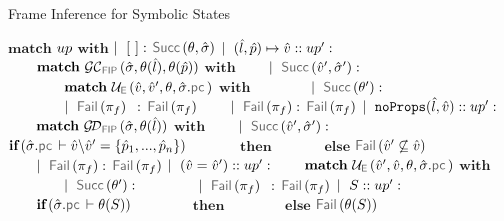 {\begin{algorithm}[h!]
\caption{Frame Inference for Symbolic States}\label{fip:symb:states:up}
\begin{algorithmic}[1]
    \State $\textbf{match}$ $up$ $\textbf{with}$
    \State $\mid~[ \ ]:$ \Return $\success{\subst, \sstate}$
    \State $\mid~(\hat{l}, \hat{p}) \mapsto \hat{v} :: up' :$ 
    \State $\qquad \textbf{match} \ \GetCellV{\sstate, \subst(\sloc), \subst(\sexprp)}$ $\textbf{with}$
    \State $\qquad \mid~\success{\sexprv', \sstate'}:$
    \State $\qquad \qquad \textbf{match} \ \unifylexpr(\sexprv, \sexprv', \subst, \sstate.\pcsel)$ $\textbf{with}$
     \State $\qquad \qquad \mid~ \success{\subst'}:$ \Return {}
      \State $\qquad \qquad \mid~ \fail{\pc_f} \ \, :$ \Return $\fail{\pc_f}$
      \State $\qquad \mid~\fail{\pc_f}:$ \Return $\fail{\pc_f}$
     \State $\mid~\texttt{noProps}(\hat{l}, \hat{v}) :: up' :$  
       \State $\qquad \textbf{match} \ \GetDomainV{\sstate, \subst(\sloc)}$ $\textbf{with}$
       \State $\qquad \mid~\success{\sexprv', \sstate'}:$ $\textbf{if} \,(\sstate.\pcsel \vdash \sexprv \backslash \sexprv' = \{ \sexprp_1, ..., \sexprp_n \})$
         \State $\qquad \quad \ ~  \textbf{then}$ \Return {}
            \State $\qquad \quad \  ~  \textbf{else}$ \Return $\fail{\sexprv' \not\subseteq \sexprv }$
       \State $\qquad \mid~\fail{\pc_f}:$ \Return $\fail{\pc_f}$
     \State $\mid~(\hat{v} = \hat{v}') :: up' :$  
        \State $\qquad \textbf{match} \ \unifylexpr(\sexprv', \sexprv, \subst, \sstate.\pcsel)$ $\textbf{with}$
         \State $\qquad \qquad \mid~ \success{\subst'}:$ \Return {}
       \State $\qquad \qquad \mid~ \fail{\pc_f} \ \, :$ \Return $\fail{\pc_f}$
     \State $\mid~S :: up' :$   
      \State $\qquad \textbf{if} \,(\sstate.\pcsel \vdash \subst(\sass))$
       \State $\qquad \qquad \textbf{then}$ \Return  {}
      \State $\qquad \qquad \textbf{else}$  \Return $\fail{\subst(\sass)}$
\EndFunction
\end{algorithmic}
\end{algorithm}}



